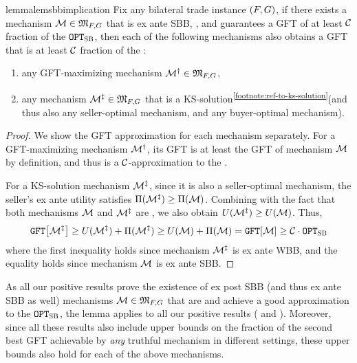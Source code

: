 \begin{restatable}{lemma}{lemsbbimplication}
\label{lem:SBB implication}
    Fix any bilateral trade instance $(F,G)$, if there exists a mechanism $\mathcal{M}\in \mathfrak{M}_{F,G}$ that is ex ante SBB, {\ksfair}, and guarantees a GFT of at least $\mathcal{C}$ fraction of the {\SecondBest} $\texttt{OPT}_{\textsc{SB}}$, then each of the following mechanisms also obtains a GFT that is at least $\mathcal{C}$ fraction of the {\SecondBest}:
\begin{enumerate}
    \item any GFT-maximizing {\ksfair} mechanism $\mathcal{M}^\dagger\in\mathfrak{M}_{F,G}$,
    \item {any mechanism $\mathcal{M}^\ddagger\in\mathfrak{M}_{F,G}$ that is a} KS-solution\textsuperscript{\ref{footnote:ref-to-ks-solution}}{(and thus also any seller-optimal {\ksfair} mechanism, and any buyer-optimal {\ksfair} mechanism)}. 
\end{enumerate}
\end{restatable}
\begin{proof}
    We show the GFT approximation for each mechanism separately. For a GFT-maximizing {\ksfair} mechanism $\mathcal{M}^\dagger$, its GFT is at least the GFT of mechanism $\mathcal{M}$ by definition, and thus is a $\mathcal{C}$-approximation {to the {\SecondBest}}. 
    
    For a KS-solution mechanism $\mathcal{M}^\ddagger$, since it is also a seller-optimal {\ksfair} mechanism, the seller's ex ante utility satisfies $\Pi(
    {\mathcal{M}^\ddagger}) \geq \Pi(\mathcal{M})$. Combining with the fact that both mechanisms $\mathcal{M}$ and $\mathcal{M}^\ddagger$ are {\ksfair}, we also obtain $U(
    {\mathcal{M}^\ddagger}) \geq U(\mathcal{M})$. Thus,
    \begin{align*}
        \GFT{
        {\mech\doubleprimed}} \geq \buyerexanteutil(
        {\mech\doubleprimed}) + \sellerexanteutil(
        {\mech\doubleprimed}) \geq \buyerexanteutil(\mech) + \sellerexanteutil(\mech)
        = \GFT{\mech} \geq \calC \cdot \OPTSB
    \end{align*}
    where the first inequality holds since mechanism $\mathcal{M}^\ddagger$ is ex ante WBB, and the equality holds since mechanism $\mathcal{M}$ is ex ante SBB. 
\end{proof}



As all our positive results prove the existence of ex post SBB {(and thus ex ante SBB as well)} mechanisms $\mathcal{M}\in \mathfrak{M}_{F,G}$ that {are} {\ksfair} and achieve a good approximation to the {\SecondBest} $\texttt{OPT}_{\textsc{SB}}$, the lemma applies to all our positive results ( and ). Moreover, since all these results also include upper bounds on the fraction of the second best GFT achievable by \emph{any} {\ksfair} truthful mechanism in different settings, these upper bounds also hold for each of the above mechanisms.
